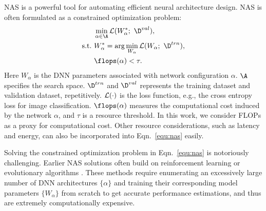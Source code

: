 \documentclass[final]{cvpr}
\theoremstyle{definition}
\begin{document}
NAS is a powerful tool for automating efficient neural architecture design.
NAS is often formulated as a constrained optimization problem:
\begin{align}
\begin{split}
&\min_{\alpha \in \A} \L(W^*_\alpha; ~\D^{val}) , \label{equ:nas} \\
\text{s.t.}~ &W^*_\alpha = \arg\min_{W_\alpha} \L(W_\alpha; ~\D^{trn}),  \\ 
&\flops(\alpha) < \tau. 
\end{split}
\end{align}
Here $W_\alpha$ is the DNN parameters associated with network configuration $\alpha$. 
$\A$ specifies the search space. 
$\D^{trn}$ and $\D^{val}$ represents the training dataset and validation dataset, repetitively. 
${\mathcal L}(\cdot)$ is the loss function, e.g., the cross entropy 
loss for image classification. 
$\flops(\alpha)$ measures the computational cost induced by the 
network $\alpha$, and $\tau$ is a resource threshold. 
In this work, we consider FLOPs as a proxy for computational cost. 
Other resource considerations, such as latency and energy, can also be incorporated into Eqn.~\eqref{equ:nas} easily.

Solving the constrained optimization problem in Eqn.~\eqref{equ:nas} is notoriously challenging. 
Earlier NAS solutions often build on reinforcement learning \cite{zoph2016neural, zoph2018learning, tan2019mnasnet, zhong2018practical} or evolutionary algorithms \cite{real2017large, real2019regularized, suganuma2018exploiting, xie2017genetic}.  
These methods require enumerating an excessively large number of DNN architectures $\{\alpha\}$ and training their corresponding model parameters $\{W_\alpha\}$ from scratch to get accurate performance estimations, 
and thus are extremely computationally expensive.

\iffalse
Most existing NAS methods can be grouped into two categories: directly using black-box optimization or optimizing over a proxy weight-sharing network \cite{cai2018proxylessnas, pham2018efficient, liu2018darts, wu2019fbnet}.
They first search the network architecture $\alpha$ and then optimize $w_\alpha$ for all candidate networks from scratch on the training set. 
Directly adopting black-box optimization, e.g. reinforcement learning \cite{zoph2016neural}
or evolutionary algorithms \cite{tan2019mnasnet}, 
is extremely time-consuming 
due to the enormous search space of possible architectures and the high cost for evaluating the performance of each candidate network.
Another approach, 
weight-sharing, aims to use almost no extra computation resources during searching.
However, it usually gives worse results than the black-box optimization approach \cite{ying2019bench}.
\fi
\end{document}
